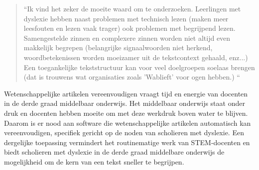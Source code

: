 \newline

\begin{quote}
	“Ik vind het zeker de moeite waard om te onderzoeken. Leerlingen met dyslexie hebben naast problemen met technisch lezen (maken meer leesfouten en lezen vaak trager) ook problemen met begrijpend lezen. Samengestelde zinnen en complexere zinnen worden niet altijd even makkelijk begrepen (belangrijke signaalwoorden niet herkend, woordbetekenissen worden moeizamer uit de tekstcontext gehaald, enz...) Een toegankelijke tekststructuur kan voor veel doelgroepen soelaas brengen (dat is trouwens wat organisaties zoals 'Wablieft' voor ogen hebben.) “
\end{quote}

\newline

Wetenschappelijke artikelen vereenvoudigen vraagt tijd en energie van docenten in de derde graad middelbaar onderwijs. Het middelbaar onderwijs staat onder druk en docenten hebben moeite om met deze werkdruk boven water te blijven. Daarom is er nood aan software die wetenschappelijke artikelen automatisch kan vereenvoudigen, specifiek gericht op de noden van scholieren met dyslexie. Een dergelijke toepassing vermindert het routinematige werk van STEM-docenten en biedt scholieren met dyslexie in de derde graad middelbare onderwijs de mogelijkheid om de kern van een tekst sneller te begrijpen.

\section{}%
\label{sec:onderzoeksvraag}




